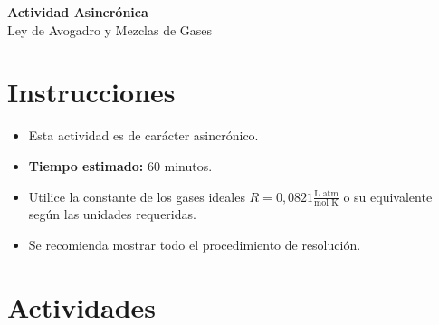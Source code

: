 \documentclass[a4paper,12pt]{article}
\begin{document}
\pagestyle{fancy}

\begin{center}
    \Huge \textbf{Actividad Asincrónica}\\
    \Large Ley de Avogadro y Mezclas de Gases
    \vspace{1cm}
\end{center}

\section*{Instrucciones}
\begin{itemize}
    \item Esta actividad es de carácter asincrónico. 
    \item \textbf{Tiempo estimado:} 60 minutos.
    \item Utilice la constante de los gases ideales $R = 0,0821 \frac{\text{L atm}}{\text{mol K}}$ o su equivalente según las unidades requeridas.
    \item Se recomienda mostrar todo el procedimiento de resolución.
\end{itemize}

\section*{Actividades}
\end{document}
